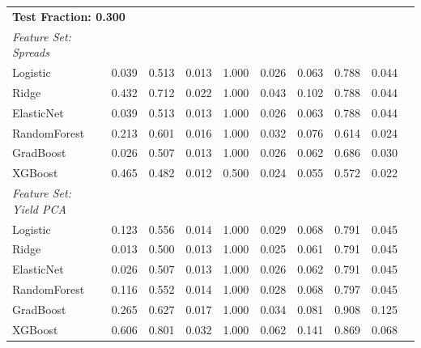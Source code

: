 \begin{longtable}{lccccccccc}
\midrule
\multicolumn{9}{l}{\textbf{Test Fraction: 0.300}} \\
\textit{Feature Set: Spreads} \\
\midrule
Logistic     & 0.039 & 0.513 & 0.013 & 1.000 & 0.026 & 0.063 & 0.788 & 0.044 \\
Ridge        & 0.432 & 0.712 & 0.022 & 1.000 & 0.043 & 0.102 & 0.788 & 0.044 \\
ElasticNet   & 0.039 & 0.513 & 0.013 & 1.000 & 0.026 & 0.063 & 0.788 & 0.044 \\
RandomForest & 0.213 & 0.601 & 0.016 & 1.000 & 0.032 & 0.076 & 0.614 & 0.024 \\
GradBoost    & 0.026 & 0.507 & 0.013 & 1.000 & 0.026 & 0.062 & 0.686 & 0.030 \\
XGBoost      & 0.465 & 0.482 & 0.012 & 0.500 & 0.024 & 0.055 & 0.572 & 0.022 \\
\addlinespace
\textit{Feature Set: Yield PCA} \\
\midrule
Logistic     & 0.123 & 0.556 & 0.014 & 1.000 & 0.029 & 0.068 & 0.791 & 0.045 \\
Ridge        & 0.013 & 0.500 & 0.013 & 1.000 & 0.025 & 0.061 & 0.791 & 0.045 \\
ElasticNet   & 0.026 & 0.507 & 0.013 & 1.000 & 0.026 & 0.062 & 0.791 & 0.045 \\
RandomForest & 0.116 & 0.552 & 0.014 & 1.000 & 0.028 & 0.068 & 0.797 & 0.045 \\
GradBoost    & 0.265 & 0.627 & 0.017 & 1.000 & 0.034 & 0.081 & 0.908 & 0.125 \\
XGBoost      & 0.606 & 0.801 & 0.032 & 1.000 & 0.062 & 0.141 & 0.869 & 0.068 \\


\end{longtable}
